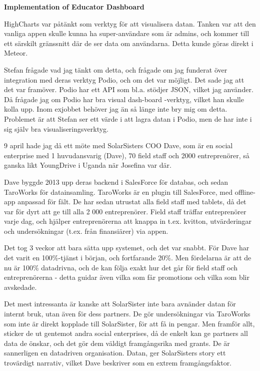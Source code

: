 \textbf{Implementation of Educator Dashboard}

HighCharts var påtänkt som verktyg för att visualisera datan. Tanken var att den vanliga appen skulle kunna ha super-användare som är admins, och kommer till ett särskilt gränssnitt där de ser data om användarna. Detta kunde göras direkt i Meteor.

Stefan frågade vad jag tänkt om detta, och frågade om jag funderat över integration med deras verktyg Podio, och om det var möjligt. Det sade jag att det var framöver. Podio har ett API som bl.a. stödjer JSON, vilket jag använder. Då frågade jag om Podio har bra visual dash-board -verktyg, vilket han skulle kolla upp. Inom exjobbet behöver jag än så länge inte bry mig om detta. Problemet är att Stefan ser ett värde i att lagra datan i Podio, men de har inte i sig själv bra visualiseringsverktyg.

9 april hade jag då ett möte med SolarSisters COO Dave, som är en social enterprise med 1 huvudansvarig (Dave), 70 field staff och 2000 entreprenörer, så ganska likt YoungDrive i Uganda när Josefina var där.

Dave byggde 2013 upp deras backend i SalesForce för databas, och sedan TaroWorks för datainsamling. TaroWorks är en plugin till SalesForce, med offline-app anpassad för fält. De har sedan utrustat alla field staff med tablets, då det var för dyrt att ge till alla 2 000 entreprenörer. Field staff träffar entreprenörer varje dag, och hjälper entreprenörerna att knappa in t.ex. kvitton, utvärderingar och undersökningar (t.ex. från finansiärer) via appen.

Det tog 3 veckor att bara sätta upp systemet, och det var snabbt. För Dave har det varit en 100\%-tjänst i början, och fortfarande 20\%. Men fördelarna är att de nu är 100\% datadrivna, och de kan följa exakt hur det går för field staff och entreprenörerna - detta guidar även vilka som får promotions och vilka som blir avskedade.

Det mest intressanta är kanske att SolarSister inte bara avnänder datan för internt bruk, utan även för dess partners. De gör undersökningar via TaroWorks som inte är direkt kopplade till SolarSister, för att få in pengar. Men framför allt, sticker de ut gentemot andra social enterprises, då de enkelt kan ge partners all data de önskar, och det gör dem väldigt framgångsrika med grants. De är sannerligen en datadriven organisation. Datan, ger SolarSisters story ett trovärdigt narrativ, vilket Dave beskriver som en extrem framgångsfaktor.

